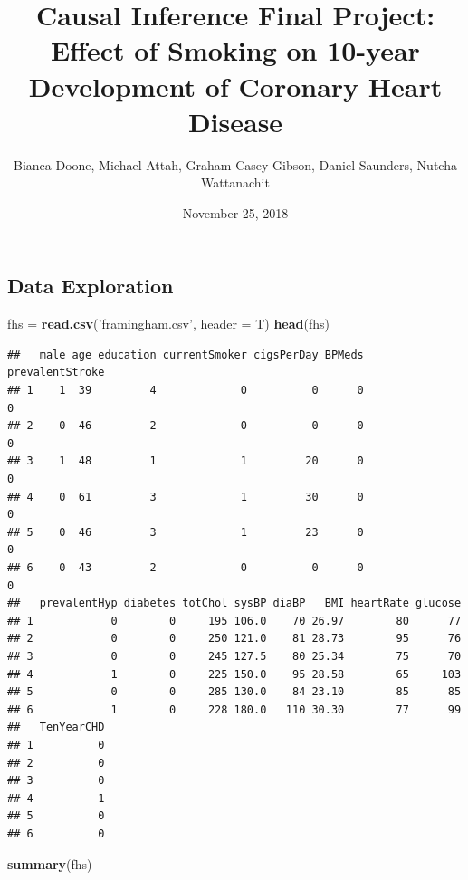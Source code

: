 \documentclass[]{article}
\title{Causal Inference Final Project: Effect of Smoking on 10-year Development
of Coronary Heart Disease}
\author{Bianca Doone, Michael Attah, Graham Casey Gibson, Daniel Saunders,
Nutcha Wattanachit}
\date{November 25, 2018}
\newenvironment{Shaded}{\begin{snugshade}}{\end{snugshade}}
\newcommand{\KeywordTok}[1]{\textcolor[rgb]{0.13,0.29,0.53}{\textbf{#1}}}
\newcommand{\DataTypeTok}[1]{\textcolor[rgb]{0.13,0.29,0.53}{#1}}
\newcommand{\StringTok}[1]{\textcolor[rgb]{0.31,0.60,0.02}{#1}}
\newcommand{\NormalTok}[1]{#1}
\begin{document}
\maketitle

\subsection{Data Exploration}\label{data-exploration}

\begin{Shaded}
\begin{Highlighting}[]
\NormalTok{fhs =}\StringTok{ }\KeywordTok{read.csv}\NormalTok{(}\StringTok{'framingham.csv'}\NormalTok{, }\DataTypeTok{header =}\NormalTok{ T)}
\KeywordTok{head}\NormalTok{(fhs)}
\end{Highlighting}
\end{Shaded}

\begin{verbatim}
##   male age education currentSmoker cigsPerDay BPMeds prevalentStroke
## 1    1  39         4             0          0      0               0
## 2    0  46         2             0          0      0               0
## 3    1  48         1             1         20      0               0
## 4    0  61         3             1         30      0               0
## 5    0  46         3             1         23      0               0
## 6    0  43         2             0          0      0               0
##   prevalentHyp diabetes totChol sysBP diaBP   BMI heartRate glucose
## 1            0        0     195 106.0    70 26.97        80      77
## 2            0        0     250 121.0    81 28.73        95      76
## 3            0        0     245 127.5    80 25.34        75      70
## 4            1        0     225 150.0    95 28.58        65     103
## 5            0        0     285 130.0    84 23.10        85      85
## 6            1        0     228 180.0   110 30.30        77      99
##   TenYearCHD
## 1          0
## 2          0
## 3          0
## 4          1
## 5          0
## 6          0
\end{verbatim}

\begin{Shaded}
\begin{Highlighting}[]
\KeywordTok{summary}\NormalTok{(fhs)}
\end{Highlighting}
\end{Shaded}
\end{document}
